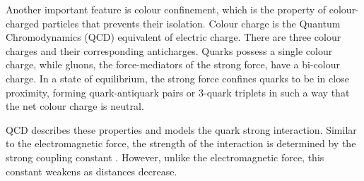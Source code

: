 Another important feature is colour confinement, which is the property of colour-charged particles that prevents their isolation.
Colour charge is the Quantum Chromodynamics (QCD) equivalent of electric charge.
There are three colour charges and their corresponding anticharges.
Quarks possess a single colour charge, while gluons, the force-mediators of the strong force, have a bi-colour charge.
In a state of equilibrium, the strong force confines quarks to be in close proximity, forming quark-antiquark pairs or 3-quark triplets in such a way that the net colour charge is neutral.

QCD describes these properties and models the quark strong interaction.
Similar to the electromagnetic force, the strength of the interaction is determined by the strong coupling constant \textalpha.
However, unlike the electromagnetic force, this constant weakens as distances decrease.
